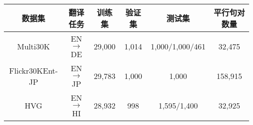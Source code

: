 
\begin{table}[!htbp]
    \label{tab:5_datasets}
    \centering
    \footnotesize%
    \setlength{\tabcolsep}{4pt}%
    \renewcommand{\arraystretch}{1.2}%
    \begin{tabular}{cccccc}
    \hline
    数据集 & 翻译任务 & 训练集 & 验证集 & 测试集 & 平行句对数量 \\\hline
    Multi30K          & EN$\rightarrow$DE   & 29,000 & 1,014 & 1,000/1,000/461 & 32,475  \\
    Flickr30KEnt-JP   & EN$\rightarrow$JP   & 29,783 & 1,000 & 1,000           & 158,915 \\
    HVG               & EN$\rightarrow$HI   & 28,932 & 998 & 1,595/1,400     & 32,925  \\
     \hline
    \end{tabular}%
\end{table}%
